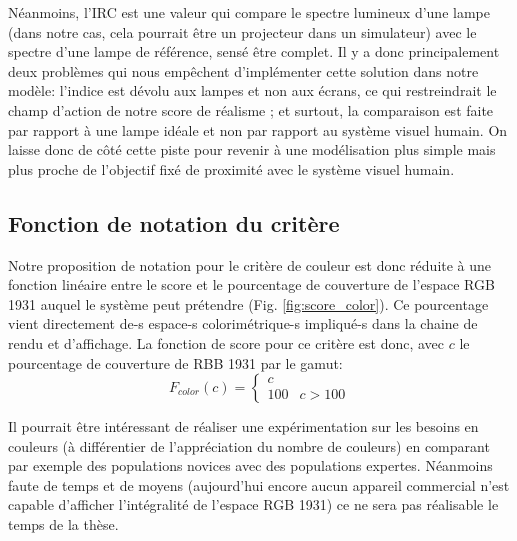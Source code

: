 	\par Néanmoins, l'IRC est une valeur qui compare le spectre lumineux d'une lampe (dans notre cas, cela pourrait être un projecteur dans un simulateur) avec le spectre d'une lampe de référence, sensé être complet. Il y a donc principalement deux problèmes qui nous empêchent d'implémenter cette solution dans notre modèle: l'indice est dévolu aux lampes et non aux écrans, ce qui restreindrait le champ d'action de notre score de réalisme ; et surtout, la comparaison est faite par rapport à une lampe idéale et non par rapport au système visuel humain. On laisse donc de côté cette piste pour revenir à une modélisation plus simple mais plus proche de l'objectif fixé de proximité avec le système visuel humain. 
	
	\subsection{Fonction de notation du critère}
	\par Notre proposition de notation pour le critère de couleur est donc réduite à une fonction linéaire entre le score et le pourcentage de couverture de l'espace RGB 1931 auquel le système peut prétendre (Fig. \ref{fig:score_color}). Ce pourcentage vient directement de-s espace-s colorimétrique-s impliqué-s dans la chaine de rendu et d'affichage. La fonction de score pour ce critère est donc, avec $c$ le pourcentage de couverture de RBB 1931 par le gamut:
	 \begin{equation}
		F_{color}(c) = \begin{cases}
		c &\\
		100 & c > 100
		\end{cases}
		\label{eq:color}
	\end{equation}
	
	\par Il pourrait être intéressant de réaliser une expérimentation sur les besoins en couleurs (à différentier de l'appréciation du nombre de couleurs) en comparant par exemple des populations novices avec des populations expertes. Néanmoins faute de temps et de moyens (aujourd'hui encore aucun appareil commercial n'est capable d'afficher l'intégralité de l'espace RGB 1931) ce ne sera pas réalisable le temps de la thèse.
	
